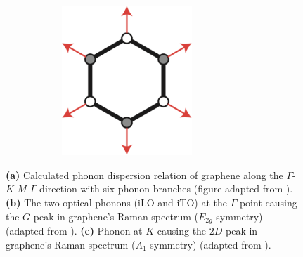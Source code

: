 \begin{figure}[!h]
\begin{subfigure}[t]{0.25\textwidth}
\begin{subfigure}[t]{\textwidth}
    \end{subfigure}
    \begin{subfigure}[t]{\textwidth}
      \centering
      \caption{}
      \includegraphics[width=0.7\textwidth]{./images/2d-mode-phonon.png}
    \end{subfigure}
  \end{subfigure}
  \caption{\textbf{(a)} Calculated phonon dispersion relation of graphene along the $\Gamma$-$K$-$M$-$\Gamma$-direction with six phonon branches (figure adapted from \cite{Malard2009}). \textbf{(b)} The two optical phonons (iLO and iTO) at the $\Gamma$-point causing the $G$ peak in graphene's Raman spectrum ($E_{2g}$ symmetry) (adapted from \cite{Ferrari2013}). \textbf{(c)} Phonon at $K$ causing the $2D$-peak in graphene's Raman spectrum ($A_1$ symmetry) (adapted from \cite{Ferrari2013}).}
  \label{fig:phonons}
\end{figure}

\newpage


